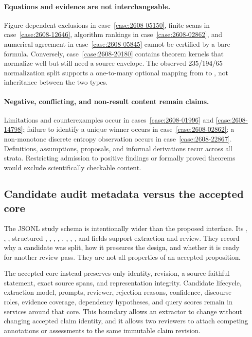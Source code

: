 \paragraph{Equations and evidence are not interchangeable.}
Figure-dependent exclusions in case~\ref{case:2608-05150}, finite scans in case~\ref{case:2608-12646}, algorithm rankings in case~\ref{case:2608-02862}, and numerical agreement in case~\ref{case:2608-05845} cannot be certified by a bare formula. Conversely, case~\ref{case:2608-20180} contains theorem kernels that normalize well but still need a source envelope. The observed 235/194/65 normalization split supports a one-to-many optional mapping from \ScientificClaim{} to \MathClaimIR{}, not inheritance between the two types.

\paragraph{Negative, conflicting, and non-result content remain claims.}
Limitations and counterexamples occur in cases~\ref{case:2608-01996} and \ref{case:2608-14798}; failure to identify a unique winner occurs in case~\ref{case:2608-02862}; a non-monotone discrete entropy observation occurs in case~\ref{case:2608-22867}. Definitions, assumptions, proposals, and informal derivations recur across all strata. Restricting admission to positive findings or formally proved theorems would exclude scientifically checkable content.

\subsection{Candidate audit metadata versus the accepted core}

\begin{sloppypar}
The JSONL study schema is intentionally wider than the proposed interface. Its , , , structured , , , , , , , , and  fields support extraction and review. They record why a candidate was split, how it pressures the design, and whether it is ready for another review pass. They are not all properties of an accepted proposition.
\end{sloppypar}

The accepted core instead preserves only identity, revision, a source-faithful statement, exact source spans, and representation integrity. Candidate lifecycle, extraction model, prompts, reviewer, rejection reasons, confidence, discourse roles, evidence coverage, dependency hypotheses, and query scores remain in services around that core. This boundary allows an extractor to change without changing accepted claim identity, and it allows two reviewers to attach competing annotations or assessments to the same immutable claim revision.

